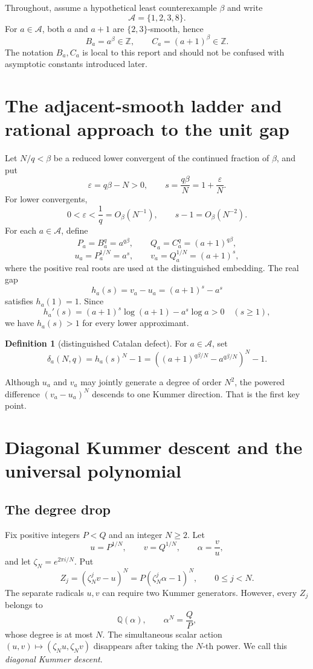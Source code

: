 \documentclass[11pt]{article}
\theoremstyle{definition}
\newtheorem{definition}[theorem]{Definition}
\theoremstyle{remark}
\newcommand{\ZZ}{\mathbb Z}
\newcommand{\QQ}{\mathbb Q}
\newcommand{\eps}{\varepsilon}
\begin{document}
Throughout, assume a hypothetical least counterexample \(\beta\) and write
\[
\mathcal A=\{1,2,3,8\}.
\]
For \(a\in\mathcal A\), both \(a\) and \(a+1\) are \(\{2,3\}\)-smooth, hence
\[
B_a=a^\beta\in\ZZ,\qquad C_a=(a+1)^\beta\in\ZZ.
\]
The notation \(B_a,C_a\) is local to this report and should not be confused with asymptotic constants introduced later.

\section{The adjacent-smooth ladder and rational approach to the unit gap}

Let \(N/q<\beta\) be a reduced lower convergent of the continued fraction of \(\beta\), and put
\[
\eps=q\beta-N>0,\qquad s=\frac{q\beta}{N}=1+\frac{\eps}{N}.
\]
For lower convergents,
\[
0<\eps<\frac1q=O_\beta(N^{-1}),\qquad s-1=O_\beta(N^{-2}).
\]
For each \(a\in\mathcal A\), define
\[
P_a=B_a^q=a^{q\beta},\qquad Q_a=C_a^q=(a+1)^{q\beta},
\]
\[
u_a=P_a^{1/N}=a^s,\qquad v_a=Q_a^{1/N}=(a+1)^s,
\]
where the positive real roots are used at the distinguished embedding.  The real gap
\[
h_a(s)=v_a-u_a=(a+1)^s-a^s
\]
satisfies \(h_a(1)=1\).  Since
\[
h_a'(s)=(a+1)^s\log(a+1)-a^s\log a>0\quad(s\ge1),
\]
we have \(h_a(s)>1\) for every lower approximant.

\begin{definition}[distinguished Catalan defect]
For \(a\in\mathcal A\), set
\[
\delta_a(N,q)=h_a(s)^N-1
 =\left((a+1)^{q\beta/N}-a^{q\beta/N}\right)^N-1.
\]
\end{definition}

Although \(u_a\) and \(v_a\) may jointly generate a degree of order \(N^2\), the powered difference \((v_a-u_a)^N\) descends to one Kummer direction.  That is the first key point.

\section{Diagonal Kummer descent and the universal polynomial}\label{sec:kummer}

\subsection{The degree drop}
Fix positive integers \(P<Q\) and an integer \(N\ge2\).  Let
\[
u=P^{1/N},\qquad v=Q^{1/N},\qquad \alpha=\frac vu,
\]
and let \(\zeta_N=e^{2\pi i/N}\).  Put
\[
Z_j=(\zeta_N^jv-u)^N=P(\zeta_N^j\alpha-1)^N,
\qquad 0\le j<N.
\]
The separate radicals \(u,v\) can require two Kummer generators.  However, every \(Z_j\) belongs to
\[
\QQ(\alpha),\qquad \alpha^N=\frac QP,
\]
whose degree is at most \(N\).  The simultaneous scalar action
\((u,v)\mapsto(\zeta_Nu,\zeta_Nv)\) disappears after taking the \(N\)-th power.  We call this \emph{diagonal Kummer descent}.
\end{document}

